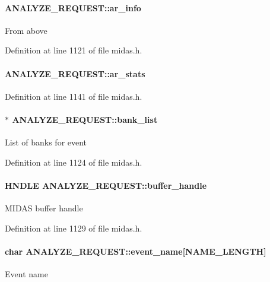 \paragraph[{ar\_\-info}]{ {\bf ANALYZE\_\-REQUEST::ar\_\-info}}\hfill\label{structANALYZE__REQUEST_abb8861e2bf01fae8d66f0f49ca6cd74c}
From above 

Definition at line 1121 of file midas.h.
\paragraph[{ar\_\-stats}]{ {\bf ANALYZE\_\-REQUEST::ar\_\-stats}}\hfill\label{structANALYZE__REQUEST_a069e2a89b82e12f5257325227343b4c0}


Definition at line 1141 of file midas.h.
\paragraph[{bank\_\-list}]{$\ast$ {\bf ANALYZE\_\-REQUEST::bank\_\-list}}\hfill\label{structANALYZE__REQUEST_a3130441b33d46c2072cd2c38d7a21497}
List of banks for event 

Definition at line 1124 of file midas.h.
\paragraph[{buffer\_\-handle}]{\setlength{\rightskip}{0pt plus 5cm}HNDLE {\bf ANALYZE\_\-REQUEST::buffer\_\-handle}}\hfill\label{structANALYZE__REQUEST_afe5109f95d2a2c6406d5b6a6c661479e}
MIDAS buffer handle 

Definition at line 1129 of file midas.h.
\paragraph[{event\_\-name}]{\setlength{\rightskip}{0pt plus 5cm}char {\bf ANALYZE\_\-REQUEST::event\_\-name}\mbox{[}NAME\_\-LENGTH\mbox{]}}\hfill\label{structANALYZE__REQUEST_abc24698c600ca2b3eec735b84832d0b0}
Event name 

